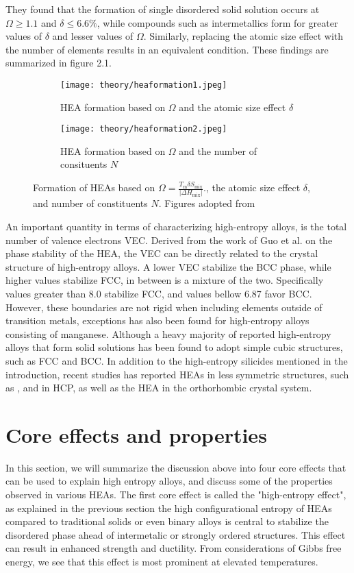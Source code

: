 They found that the formation of single disordered solid solution occurs at $\Omega \geq 1.1$ and $\delta \leq 6.6\%$, while compounds such as intermetallics form for greater values of $\delta$ and lesser values of $\Omega$. Similarly, replacing the atomic size effect with the number of elements results in an equivalent condition. These findings are summarized in figure 2.1.
\begin{figure}[H]
\centering
\begin{subfigure}{.85\textwidth}
\texttt{[image: theory/heaformation1.jpeg]}
\caption{HEA formation based on $\Omega$ and the atomic size effect $\delta$}
\end{subfigure}
\begin{subfigure}{.85\textwidth}
\texttt{[image: theory/heaformation2.jpeg]}
\caption{HEA formation based on $\Omega$ and the number of consituents $N$}
\end{subfigure}
\caption{Formation of HEAs based on $\Omega = \frac{T_\text{m} \delta S_\text{mix}}{|\Delta H_\text{mix}|}.$, the atomic size effect $\delta$, and number of constituents $N$. Figures adopted from \cite{hea2016_ch2}}
\end{figure} 
An important quantity in terms of characterizing high-entropy alloys, is the total number of valence electrons VEC. Derived from the work of Guo et al. on the phase stability of the  HEA, the VEC can be directly related to the crystal structure of high-entropy alloys. A lower VEC stabilize the BCC phase, while higher values stabilize FCC, in between is a mixture of the two. Specifically values greater than 8.0 stabilize FCC, and values bellow 6.87 favor BCC. However, these boundaries are not rigid when including elements outside of transition metals, exceptions has also been found for high-entropy alloys consisting of manganese. Although a heavy majority of reported high-entropy alloys that form solid solutions has been found to adopt simple cubic structures, such as FCC and BCC. In addition to the high-entropy silicides mentioned in the introduction, recent studies has reported HEAs in less symmetric structures, such as ,  and  in HCP, as well as the  HEA in the orthorhombic crystal system.  

\section{Core effects and properties}
In this section, we will summarize the discussion above into four core effects that can be used to explain high entropy alloys, and discuss some of the properties observed in various HEAs. The first core effect is called the "high-entropy effect", as explained in the previous section the high configurational entropy of HEAs compared to traditional solids or even binary alloys is central to stabilize the disordered phase ahead of intermetalic or strongly ordered structures. This effect can result in enhanced strength and ductility. From considerations of Gibbs free energy, we see that this effect is most prominent at elevated temperatures.

